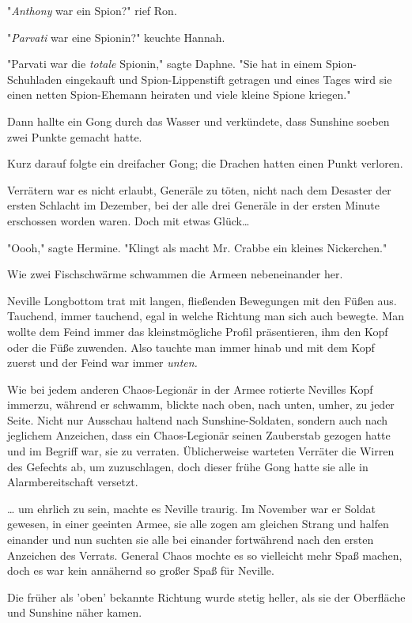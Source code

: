{"\emph{Anthony} war ein Spion?" rief Ron.

"\emph{Parvati} war eine Spionin?" keuchte Hannah.

"Parvati war die \emph{totale} Spionin," sagte Daphne. "Sie hat in einem Spion-Schuhladen eingekauft und Spion-Lippenstift getragen und eines Tages wird sie einen netten Spion-Ehemann heiraten und viele kleine Spione kriegen."

Dann hallte ein Gong durch das Wasser und verkündete, dass Sunshine soeben zwei Punkte gemacht hatte.

Kurz darauf folgte ein dreifacher Gong; die Drachen hatten einen Punkt verloren.

Verrätern war es nicht erlaubt, Generäle zu töten, nicht nach dem Desaster der ersten Schlacht im Dezember, bei der alle drei Generäle in der ersten Minute erschossen worden waren. Doch mit etwas Glück…

"Oooh," sagte Hermine. "Klingt als macht Mr. Crabbe ein kleines Nickerchen."

\later

Wie zwei Fischschwärme schwammen die Armeen nebeneinander her.

Neville Longbottom trat mit langen, fließenden Bewegungen mit den Füßen aus. Tauchend, immer tauchend, egal in welche Richtung man sich auch bewegte. Man wollte dem Feind immer das kleinstmögliche Profil präsentieren, ihm den Kopf oder die Füße zuwenden. Also tauchte man immer hinab und mit dem Kopf zuerst und der Feind war immer \emph{unten.}

Wie bei jedem anderen Chaos-Legionär in der Armee rotierte Nevilles Kopf immerzu, während er schwamm, blickte nach oben, nach unten, umher, zu jeder Seite. Nicht nur Ausschau haltend nach Sunshine-Soldaten, sondern auch nach jeglichem Anzeichen, dass ein Chaos-Legionär seinen Zauberstab gezogen hatte und im Begriff war, sie zu verraten. Üblicherweise warteten Verräter die Wirren des Gefechts ab, um zuzuschlagen, doch dieser frühe Gong hatte sie alle in Alarmbereitschaft versetzt.

… um ehrlich zu sein, machte es Neville traurig. Im November war er Soldat gewesen, in einer geeinten Armee, sie alle zogen am gleichen Strang und halfen einander und nun suchten sie alle bei einander fortwährend nach den ersten Anzeichen des Verrats. General Chaos mochte es so vielleicht mehr Spaß machen, doch es war kein annähernd so großer Spaß für Neville.

Die früher als 'oben' bekannte Richtung wurde stetig heller, als sie der Oberfläche und Sunshine näher kamen.

}
